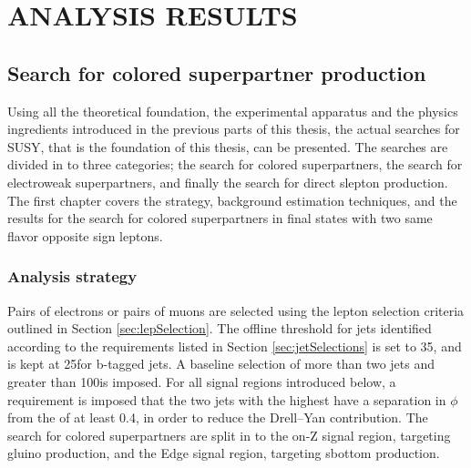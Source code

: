 \part{ANALYSIS RESULTS}
\chapter{Search for colored superpartner production}\label{sec:strong}
\noindent
\justify
Using all the theoretical foundation, the experimental apparatus and the physics ingredients introduced in the previous parts of this thesis, the actual searches for SUSY, that is the foundation of this thesis, can be presented. 
The searches are divided in to three categories; the search for colored superpartners, the search for electroweak superpartners, and finally the search for direct slepton production. 
The first chapter covers the strategy, background estimation techniques, and the results for the search for colored superpartners in final states with two same flavor opposite sign leptons.
\newpage
\section{Analysis strategy}
\noindent
\justify
Pairs of electrons or pairs of muons are selected using the lepton selection criteria outlined in Section \ref{sec:lepSelection}.  
The offline \pt threshold for jets identified according to the requirements listed in Section \ref{sec:jetSelections} is set to 35\GeV, and is kept at 25\GeV for b-tagged jets.
A baseline selection of more than two jets and \ptmiss greater than 100\GeV is imposed. 
For all signal regions introduced below, a requirement is imposed that the two jets with the highest \pt have a separation in $\phi$ from the \ptmiss of at least 0.4, in order to reduce the Drell--Yan contribution.
The search for colored superpartners are split in to the on-Z signal region, targeting gluino production, and the Edge signal region, targeting sbottom production.
